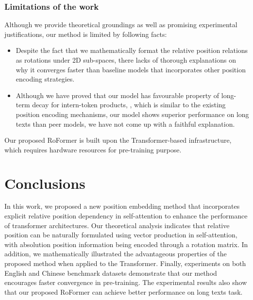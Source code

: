 \documentclass{article}
\begin{document}
\subsubsection{Limitations of the work} 
Although we provide theoretical groundings as well as promising experimental justifications, our method is limited by following facts: 
\begin{itemize}
	\item Despite the fact that we mathematically format the relative position relations as rotations under 2D sub-spaces, there lacks of thorough explanations on why it converges faster than baseline models that incorporates other position encoding strategies.
	\item Although we have proved that our model has favourable property of long-term decay for intern-token products, , which is similar to the existing position encoding mechanisms, our model shows superior performance on long texts than peer models, we have not come up with a faithful explanation.
\end{itemize}
Our proposed RoFormer is built upon the  Transformer-based infrastructure, which requires  hardware resources for pre-training purpose.

\section{Conclusions} \label{sec:conclu}

In this work, we proposed a new position embedding method that incorporates explicit relative position dependency in self-attention to enhance the performance of transformer architectures. Our theoretical analysis indicates that relative position can be naturally formulated using vector production in self-attention, with absolution position information being encoded through a rotation matrix. In addition, we mathematically illustrated the advantageous properties of the proposed method when applied to the Transformer. Finally, experiments on both English and Chinese benchmark datasets demonstrate that our method encourages faster convergence in pre-training. The experimental results also show that our proposed RoFormer can achieve better performance on long texts task. 


  
\end{document}
